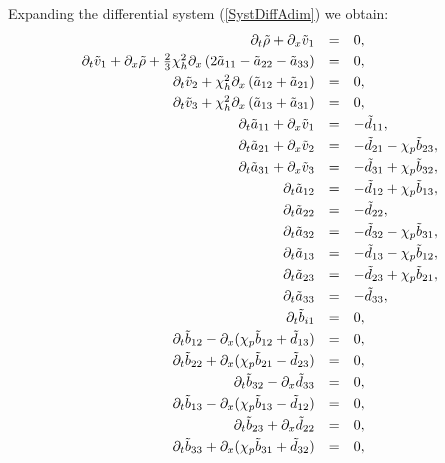\documentclass[
10pt, %
a4paper, %
oneside, %
headinclude,footinclude, %
table
]{scrartcl}
\begin{document}
\begin{remark} Expanding the differential system (\ref{SystDiffAdim}) we obtain:\\
$$
\begin{array}{rcl}
\pd_{t}{\tilde{\rho }}+\pd_{x}{\tilde{v}_1}&=&0,\\[1mm]
\pd_{t}{\tilde{v}_1} + \pd_{x}{\tilde{\rho
}} + \frac{2}{3} \chi _h^2 \pd_{x} \left(2   
\tilde{a}_{11} - \tilde{a}_{22} - \tilde{a}_{33}\right)&=&0,\\[1mm]
%
\pd_t\tilde{v}_2 + \chi _h^2   
\pd_{x} \left(\tilde{a}_{12} + \tilde{a}_{21}\right)&=&0,\\[1mm]
%
\pd_{t}\tilde{v}_3 + \chi_h^2 \pd_{x} \left(\tilde{a}_{13} + \tilde{a}_{31} \right)&=&0,\\[1mm]
\pd_{t}{\tilde{a}_{11}}+\pd_{x}{\tilde{v}_1}&=&-\tilde{d}_{11},\\[1mm]
%    
\pd_{t}{\tilde{a}_{21}}+\pd_{x}{\tilde{v}_2}&=&- \tilde{d}_{21} - \chi _p\tilde{b}_{23},\\[1mm]
%
\pd_{t}{\tilde{a}_{31}}+\pd_{x}{\tilde{v}_3}&=& - \tilde{d}_{31} + \chi _p\tilde{b}_{32},\\[1mm]
%
\pd_{t}{\tilde{a}_{12}}&=&- \tilde{d}_{12} + \chi_p\tilde{b}_{13},\\[1mm]
%
\pd_{t}{\tilde{a}_{22}}&=&- \tilde{d}_{22},\\[1mm]
%
\pd_{t}{\tilde{a}_{32}}&=&-\tilde{d}_{32} - \chi _p\tilde{b}_{31},\\[1mm]
%
\pd_{t}{\tilde{a}_{13}}&=& - \tilde{d}_{13} -\chi_p\tilde{b}_{12},\\[1mm]
%
\pd_{t}{\tilde{a}_{23}}&=& -\tilde{d}_{23} + \chi_p\tilde{b}_{21},\\[1mm]%
%
\pd_{t}{\tilde{a}_{33}}&=& - \tilde{d}_{33},\\[1mm]
\pd_{t}{\tilde{b}_{i1}}&=&0,\\[1mm]
%
\pd_{t}{\tilde{b}_{12}}- \pd_{x} (\chi_p{\tilde{b}_{12}} + {\tilde{d}_{13}})&=&0,\\[1mm]
%
\pd_{t}{\tilde{b}_{22}} + \pd_{x} (\chi _p{\tilde{b}_{21}} - {\tilde{d}_{23}})&=&0,\\[1mm]
%
\pd_{t}{\tilde{b}_{32}}-\pd_{x}{\tilde{d}_{33}}&=&0,\\[1mm]
%
\pd_{t}{\tilde{b}_{13}} - \pd_{x}(\chi_p\tilde{b}_{13} - \tilde{d}_{12})&=&0,\\[1mm]
%
\pd_{t}{\tilde{b}_{23}}+\pd_{x}{\tilde{d}_{22}}&=&0,\\[1mm]
%
\pd_{t}{\tilde{b}_{33}} + \pd_{x}(\chi_p\tilde{b}_{31}+\tilde{d}_{32})&=&0,\\[1mm]

\end{array}$$
\end{remark}
\end{document}
